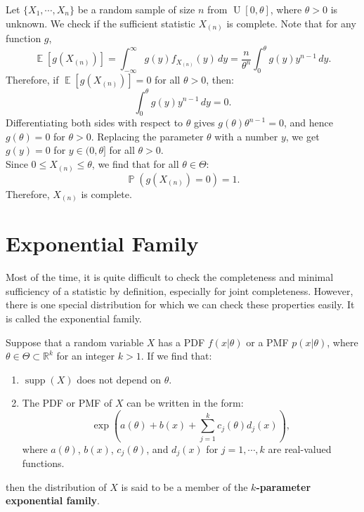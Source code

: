 \documentclass{huhtakm-template-book-v2}
\DeclareMathOperator{\prob}{\mathbb{P}}
\DeclareMathOperator{\E}{\mathbb{E}}
\DeclareMathOperator{\supp}{supp}
\DeclareMathOperator{\U}{U}
\begin{document}
    \begin{eg}
        \label{Chapter 3 (Example) complete and sufficient statistic of U[0,theta]}
        Let $\{X_{1},\cdots,X_{n}\}$ be a random sample of size $n$ from $\U[0,\theta]$, where $\theta>0$ is unknown. We check if the sufficient statistic $X_{(n)}$ is complete. Note that for any function $g$,
        \begin{equation*}
            \E[g(X_{(n)})]=\int_{-\infty}^\infty g(y)f_{X_{(n)}}(y)\,dy=\frac{n}{\theta^{n}}\int_{0}^{\theta}g(y)y^{n-1}\,dy.
        \end{equation*}
        Therefore, if $\E[g(X_{(n)})]=0$ for all $\theta>0$, then:
        \begin{equation*}
            \int_{0}^{\theta}g(y)y^{n-1}\,dy=0.
        \end{equation*}
        Differentiating both sides with respect to $\theta$ gives $g(\theta)\theta^{n-1}=0$, and hence $g(\theta)=0$ for $\theta>0$. Replacing the parameter $\theta$ with a number $y$, we get $g(y)=0$ for $y\in(0,\theta]$ for all $\theta>0$.\\
        Since $0\leq X_{(n)}\leq\theta$, we find that for all $\theta\in\Theta$:
        \begin{equation*}
            \prob(g(X_{(n)})=0)=1.
        \end{equation*}
        Therefore, $X_{(n)}$ is complete.
    \end{eg}

\section{Exponential Family}
    Most of the time, it is quite difficult to check the completeness and minimal sufficiency of a statistic by definition, especially for joint completeness. However, there is one special distribution for which we can check these properties easily. It is called the exponential family.
    \begin{defn}
        Suppose that a random variable $X$ has a PDF $f(x|\theta)$ or a PMF $p(x|\theta)$, where $\theta\in\Theta\subset\mathbb{R}^{k}$ for an integer $k>1$. If we find that:
        \begin{enumerate}
            \item $\supp(X)$ does not depend on $\theta$.
            \item The PDF or PMF of $X$ can be written in the form:
            \begin{equation*}
                \exp\left(a(\theta)+b(x)+\sum_{j=1}^{k}c_{j}(\theta)d_{j}(x)\right),
            \end{equation*}
            where $a(\theta)$, $b(x)$, $c_{j}(\theta)$, and $d_{j}(x)$ for $j=1,\cdots,k$ are real-valued functions.
        \end{enumerate}
        then the distribution of $X$ is said to be a member of the \textbf{$k$-parameter exponential family}.
    \end{defn}
    \newpage
    
\end{document}
